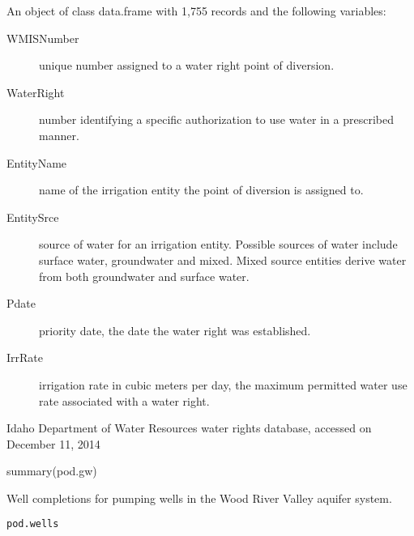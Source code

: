 \documentclass[a4paper]{book}
\begin{document}
\begin{Format}
An object of class data.frame with 1,755 records and the following variables:
\begin{description}

\item[WMISNumber] unique number assigned to a water right point of diversion.
\item[WaterRight] number identifying a specific authorization to use
water in a prescribed manner.
\item[EntityName] name of the irrigation entity the point of diversion is assigned to.
\item[EntitySrce] source of water for an irrigation entity.
Possible sources of water include surface water, groundwater and mixed.
Mixed source entities derive water from both groundwater and surface water.
\item[Pdate] priority date, the date the water right was established.
\item[IrrRate] irrigation rate in cubic meters per day,
the maximum permitted water use rate associated with a water right.

\end{description}
\end{Format}
%
\begin{Source}\relax
Idaho Department of Water Resources water rights database,
accessed on December 11, 2014
\end{Source}
%
\begin{SeeAlso}\relax
{}
\end{SeeAlso}
%
\begin{Examples}
\begin{ExampleCode}
summary(pod.gw)

\end{ExampleCode}
\end{Examples}
%
\begin{Description}\relax
Well completions for pumping wells in the Wood River Valley aquifer system.
\end{Description}
%
\begin{Usage}
\begin{verbatim}
pod.wells
\end{verbatim}
\end{Usage}
%
\end{document}
